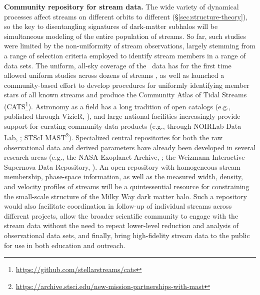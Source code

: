 \documentclass[final,5p,times,twocolumn,authoryear]{elsarticle}
\begin{document}
\textbf{Community repository for stream data.}
The wide variety of dynamical processes affect streams on different orbits to different  (\S\ref{sec:structure-theory}), so the key to disentangling signatures of dark-matter subhalos will be simultaneous modeling of the entire population of streams.
So far, such studies were limited by the non-uniformity of stream observations, largely stemming from a range of selection criteria employed to identify stream members in a range of data sets.
The uniform, all-sky coverage of the \gaia\ data has for the first time allowed uniform studies across dozens of streams \citep[e.g.,][]{bonaca:2021,malhan:2022,ibata:2023}, as well as launched a community-based effort to develop procedures for uniformly identifying member stars of all known streams and produce the Community Atlas of Tidal Streams (CATS\footnote{\url{https://github.com/stellarstreams/cats}}).
Astronomy as a field has a long tradition of open catalogs (e.g., published through VizieR, \citealt{ochsenbein:2000}), and large national facilities increasingly provide support for curating community data products (e.g., through NOIRLab Data Lab, \citealt{nikutta:2020}; STScI MAST\footnote{\url{https://archive.stsci.edu/new-mission-partnerships-with-mast}}).
Specialized central repositories for both the raw observational data and derived parameters have already been developed in several research areas (e.g., the NASA Exoplanet Archive, \citealt{akeson:2013}; the Weizmann Interactive Supernova Data Repository, \citealt{yaron:2012}).
An open repository with homogeneous stream membership, phase-space information, as well as the measured width, density, and velocity profiles of streams will be a quintessential resource for constraining the small-scale structure of the Milky Way dark matter halo.
Such a repository would also facilitate coordination in follow-up of individual streams across different projects, allow the broader scientific community to engage with the stream data without the need to repeat lower-level reduction and analysis of observational data sets, and finally, bring high-fidelity stream data to the public for use in both education and outreach.
\end{document}

